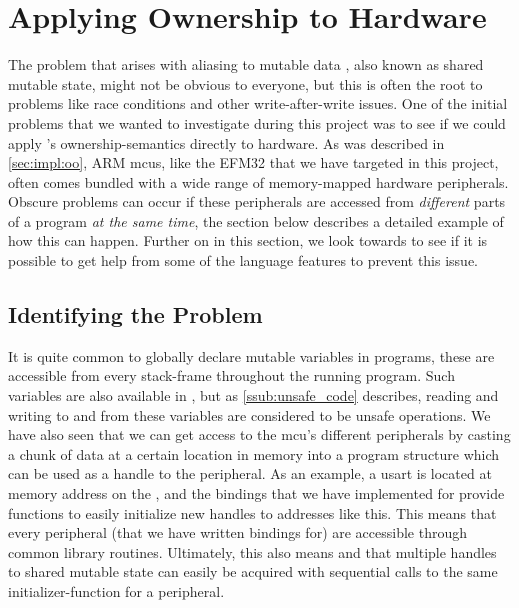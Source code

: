 
\section{Applying Ownership to Hardware}
\label{sec:ownership_allied_to_hardware}

The problem that arises with aliasing to mutable data \cite{web:problem_with_shared_mutability}, also known as shared mutable state, might not be obvious to everyone, but this is often the root to problems like race conditions and other write-after-write issues.
One of the initial problems that we wanted to investigate during this project was to see if we could apply {\rust}'s ownership-semantics directly to hardware.
As was described in \autoref{sec:impl:oo}, ARM \glspl{mcu}, like the EFM32 that we have targeted in this project, often comes bundled with a wide range of memory-mapped hardware peripherals.
Obscure problems can occur if these peripherals are accessed from \emph{different} parts of a program \emph{at the same time}, the section below describes a detailed example of how this can happen.
Further on in this section, we look towards {\rust} to see if it is possible to get help from some of the language features to prevent this issue.

\subsection{Identifying the Problem}

It is quite common to globally declare mutable variables in {\C} programs, these are accessible from every stack-frame throughout the running program.
Such variables are also available in {\rust}, but as \autoref{ssub:unsafe_code} describes, reading and writing to and from these variables are considered to be unsafe operations.
We have also seen that we can get access to the \gls{mcu}'s different peripherals by casting a chunk of data at a certain location in memory into a program structure which can be used as a handle to the peripheral.
As an example, a \gls{usart} is located at memory address  on the {\gecko}, and the bindings that we have implemented for {\emlib} provide functions to easily initialize new handles to addresses like this.
This means that every peripheral (that we have written bindings for) are accessible through common library routines.
Ultimately, this also means and that multiple handles to shared mutable state can easily be acquired with sequential calls to the same initializer-function for a peripheral.

